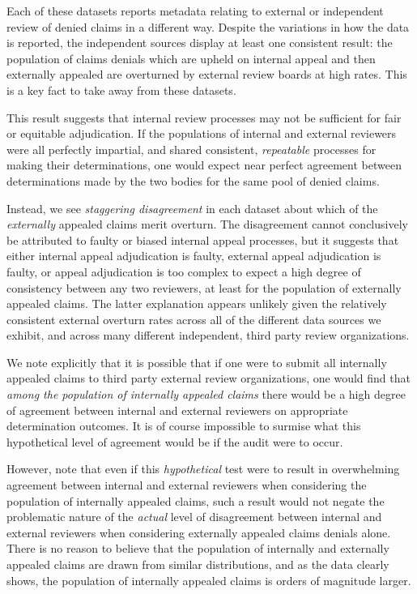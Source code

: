 \documentclass[12pt, a4paper,twoside,parskip=full]{report}
\theoremstyle{plain} %
\theoremstyle{definition} %
\theoremstyle{remark} %
\numberwithin{equation}{chapter}
\begin{document}
		Each of these datasets reports metadata relating to external or independent review of denied claims in a different way. Despite the variations in how the data is reported, the independent sources display at least one consistent result: the population of claims denials which are upheld on internal appeal and then externally appealed are overturned by external review boards at high rates. This is a key fact to take away from these datasets.
		
		
		This result suggests that internal review processes may not be sufficient for fair or equitable adjudication. If the populations of internal and external reviewers were all perfectly impartial, and shared consistent, \emph{repeatable} processes for making their determinations, one would expect near perfect agreement between determinations made by the two bodies for the same pool of denied claims.
		
		Instead, we see \emph{staggering disagreement} in each dataset about which of the \emph{externally} appealed claims merit overturn. The disagreement cannot conclusively be attributed to faulty or biased internal appeal processes, but it suggests that either internal appeal adjudication is faulty, external appeal adjudication is faulty, or appeal adjudication is too complex to expect a high degree of consistency between any two reviewers, at least for the population of externally appealed claims. The latter explanation appears unlikely given the relatively consistent external overturn rates across all of the different data sources we exhibit, and across many different independent, third party review organizations.
		
		We note explicitly that it is possible that if one were to submit all internally appealed claims to third party external review organizations, one would find that \emph{among the population of internally appealed claims} there would be a high degree of agreement between internal and external reviewers on appropriate determination outcomes. It is of course impossible to surmise what this hypothetical level of agreement would be if the audit were to occur.
		
		However, note that even if this \emph{hypothetical} test were to result in overwhelming agreement between internal and external reviewers when considering the population of internally appealed claims, such a result would not negate the problematic nature of the \emph{actual} level of disagreement between internal and external reviewers when considering externally appealed claims denials alone. There is no reason to believe that the population of internally and externally appealed claims are drawn from similar distributions, and as the data clearly shows, the population of internally appealed claims is orders of magnitude larger.
		
\end{document}
